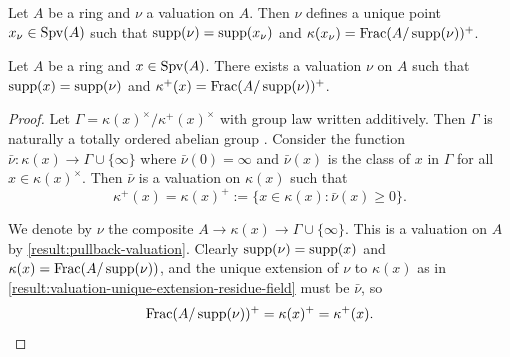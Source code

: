 \begin{lemma}
Let $A$ be a ring and $\nu$ a valuation on $A$. Then $\nu$ defines a unique point $x_\nu \in \operatorname{Spv}(A)$ such that $\operatorname{supp}(\nu) = \operatorname{supp}(x_\nu)$ and $\kappa(x_\nu) = \operatorname{Frac}(A/\operatorname{supp}(\nu))^+$. 
\end{lemma}


\begin{lemma}
Let $A$ be a ring and $x \in \operatorname{Spv}(A)$. There exists a valuation $\nu$ on $A$ such that $\operatorname{supp}(x) = \operatorname{supp}(\nu)$ and $\kappa^+(x) = \operatorname{Frac}(A/\operatorname{supp}(\nu))^+$. 
\end{lemma}

\begin{proof}
Let $\Gamma = \kappa(x)^\times / \kappa^+(x)^\times$ with group law written additively. Then $\Gamma$ is naturally a totally ordered abelian group . Consider the function $\bar{\nu} : \kappa(x) \to \Gamma \cup \{\infty\}$ where $\bar{\nu}(0) = \infty$ and $\bar{\nu}(x)$ is the class of $x$ in $\Gamma$ for all $x \in \kappa(x)^\times$. Then $\bar{\nu}$ is a valuation on $\kappa(x)$ such that
\[ \kappa^+(x) = \kappa(x)^+ := \{ x \in \kappa(x) : \bar{\nu}(x) \geq 0 \}.  \]

We denote by $\nu$ the composite $A \to \kappa(x) \to \Gamma \cup \{\infty\}$. This is a valuation on $A$ by \cref{result:pullback-valuation}. Clearly $\operatorname{supp}(\nu) = \operatorname{supp}(x)$ and $\kappa(x) = \operatorname{Frac}(A/\operatorname{supp}(\nu))$, and the unique extension of $\nu$ to $\kappa(x)$ as in \cref{result:valuation-unique-extension-residue-field} must be $\bar{\nu}$, so 
\[ \operatorname{Frac}(A/\operatorname{supp}(\nu))^+ = \kappa(x)^+ = \kappa^+(x). \qedhere \]
\end{proof}


